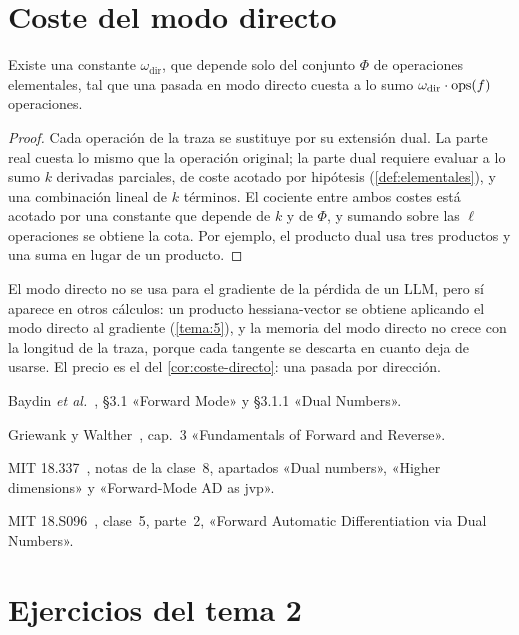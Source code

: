 \section{Coste del modo directo}

\begin{proposicion}\label{prop:coste-dual}
Existe una constante $\omega_{\mathrm{dir}}$, que depende solo del conjunto $\Phi$ de operaciones elementales, tal que una pasada en modo directo cuesta a lo sumo $\omega_{\mathrm{dir}}\cdot\operatorname{ops}(f)$ operaciones.
\end{proposicion}

\begin{proof}
Cada operación de la traza se sustituye por su extensión dual. La parte real cuesta lo mismo que la operación original; la parte dual requiere evaluar a lo sumo $k$ derivadas parciales, de coste acotado por hipótesis (\cref{def:elementales}), y una combinación lineal de $k$ términos. El cociente entre ambos costes está acotado por una constante que depende de $k$ y de $\Phi$, y sumando sobre las $\ell$ operaciones se obtiene la cota. Por ejemplo, el producto dual usa tres productos y una suma en lugar de un producto.
\end{proof}

\begin{observacion}
El modo directo no se usa para el gradiente de la pérdida de un LLM, pero sí aparece en otros cálculos: un producto hessiana-vector se obtiene aplicando el modo directo al gradiente (\cref{tema:5}), y la memoria del modo directo no crece con la longitud de la traza, porque cada tangente se descarta en cuanto deja de usarse. El precio es el del \cref{cor:coste-directo}: una pasada por dirección.
\end{observacion}

\begin{lecturas}
\item Baydin \emph{et al.}~\cite{baydin}, §3.1 «Forward Mode» y §3.1.1 «Dual Numbers».
\item Griewank y Walther~\cite{gw}, cap.~3 «Fundamentals of Forward and Reverse».
\item MIT 18.337~\cite{mit18337}, notas de la clase~8, apartados «Dual numbers», «Higher dimensions» y «Forward-Mode AD as jvp».
\item MIT 18.S096~\cite{mit18s096}, clase~5, parte~2, «Forward Automatic Differentiation via Dual Numbers».
\end{lecturas}

\section*{Ejercicios del tema 2}


